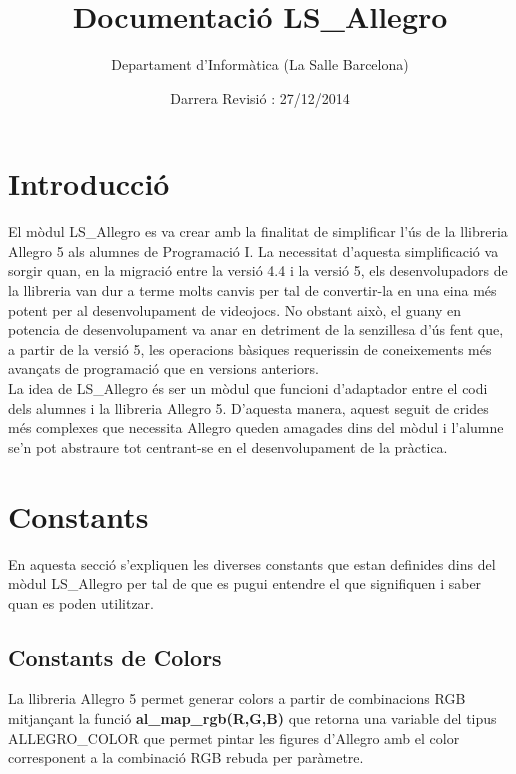 \documentclass[11pt]{article}
\title{Documentació LS\_Allegro}
\author{Departament d'Informàtica (La Salle Barcelona)}
\date{Darrera Revisió : 27/12/2014}
\begin{document}
\begin{titlepage}
\clearpage\maketitle
\thispagestyle{empty}
\newpage
\clearpage\tableofcontents
\thispagestyle{empty}
\end{titlepage}


\newpage


\section{Introducció}
El mòdul LS\_Allegro es va crear amb la finalitat de simplificar l'ús de la llibreria Allegro 5 als alumnes de Programació I. La necessitat d'aquesta simplificació va sorgir quan, en la migració entre la versió 4.4 i la versió 5, els desenvolupadors de la llibreria van dur a terme molts canvis per tal de convertir-la en una eina més potent per al desenvolupament de videojocs. No obstant això, el guany en potencia de desenvolupament va anar en detriment de la senzillesa d'ús fent que, a partir de la versió 5, les operacions bàsiques requerissin de coneixements més avançats de programació que en versions anteriors.\\

\noindent La idea de LS\_Allegro és ser un mòdul que funcioni d'adaptador entre el codi dels alumnes i la llibreria Allegro 5. D'aquesta manera, aquest seguit de crides més complexes que necessita Allegro queden amagades dins del mòdul i l'alumne se'n pot abstraure tot centrant-se en el desenvolupament de la pràctica.

\section{Constants}
En aquesta secció s'expliquen les diverses constants que estan definides dins del mòdul LS\_Allegro per tal de que es pugui entendre el que signifiquen i saber quan es poden utilitzar.

\subsection{Constants de Colors}
La llibreria Allegro 5 permet generar colors a partir de combinacions RGB mitjançant la funció \textbf{al\_map\_rgb(R,G,B)} que retorna una variable del tipus ALLEGRO\_COLOR que permet pintar les figures d'Allegro amb el color corresponent a la combinació RGB rebuda per paràmetre.\\
\end{document}
